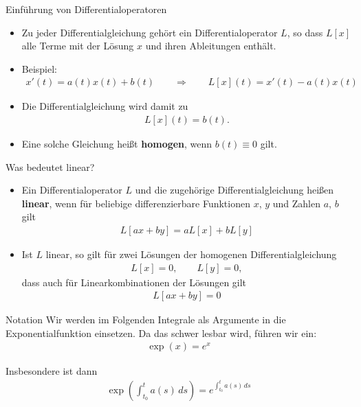 \begin{frame}{Einführung von Differentialoperatoren}
  \begin{itemize}
  \item Zu jeder Differentialgleichung gehört ein Differentialoperator
    $L$, so dass $L[x]$ alle Terme mit der Lösung $x$ und ihren
    Ableitungen enthält.
  \item Beispiel:
    \begin{gather*}
      x'(t) = a(t) x(t) + b(t)
      \qquad\Rightarrow\qquad
      L[x](t) = x'(t) - a(t)x(t)
    \end{gather*}
  \item Die Differentialgleichung wird damit zu
    \begin{gather*}
      L[x](t) = b(t).
    \end{gather*}
  \item
    Eine solche Gleichung heißt \textbf{homogen}, wenn $b(t)\equiv 0$ gilt.
  \end{itemize}
\end{frame}

\begin{frame}{Was bedeutet linear?}
  \begin{itemize}
  \item Ein Differentialoperator $L$ und die zugehörige
    Differentialgleichung heißen \textbf{linear}, wenn für beliebige
    differenzierbare Funktionen $x$, $y$ und Zahlen $a$, $b$ gilt
    \begin{gather*}
      L[ax+by] = aL[x] + bL[y]
    \end{gather*}
  \item Ist $L$ linear, so gilt für zwei Lösungen der homogenen Differentialgleichung
    \begin{gather*}
      L[x] = 0,\qquad L[y]=0,
    \end{gather*}
    dass auch für Linearkombinationen der Lösungen gilt
    \begin{gather*}
      L[ax+by] = 0
    \end{gather*}
  \end{itemize}
\end{frame}

\begin{frame}
  \begin{block}{Notation}
    Wir werden im Folgenden Integrale als Argumente in die
    Exponentialfunktion einsetzen. Da das schwer lesbar wird, führen
    wir ein:
    \begin{gather*}
      \exp(x) = e^x
    \end{gather*}
  \end{block}

  Insbesondere ist dann
  \begin{gather*}
    \exp\left(\int_{t_0}^t a(s)\,ds\right) =
    e^{\int_{t_0}^t a(s)\,ds}
  \end{gather*}
\end{frame}

